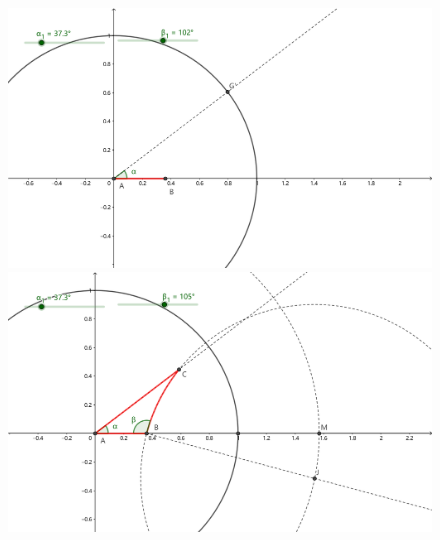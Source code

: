 \documentclass{article}
\begin{document}
\begin{figure}[ht]%
    \centering
    \begin{minipage}{0.25\linewidth}
        \centering
        \includegraphics[width={0.9\linewidth}]{B9.png}
        \caption{}
        \label{step1}
    \end{minipage}
    \begin{minipage}{0.25\linewidth}
        \centering
        \includegraphics[width={0.9\linewidth}]{B7.png}
        \caption{}
        \label{step2}
    \end{minipage}
\end{figure}
\end{document}
